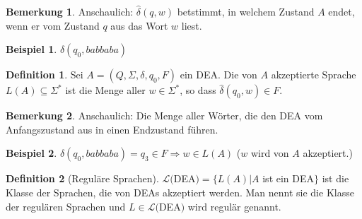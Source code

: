 \documentclass[11pt]{article} %
\theoremstyle{definition}
\newtheorem*{beispiel}{Beispiel}
\newtheorem{definition}{Definition}
\newtheorem*{bemerkung}{Bemerkung}
\begin{document}
\begin{bemerkung}
Anschaulich: $\hat{\delta}(q,w)$ betstimmt, in welchem Zustand $A$ endet, wenn er vom Zustand $q$ aus das Wort $w$ liest.
\end{bemerkung}

\begin{beispiel}
$\hat{\delta}(q_0, babbaba)$
\end{beispiel}

\begin{definition}
Sei $A = (Q, \Sigma, \delta, q_0, F)$ ein DEA. Die von $A$ akzeptierte Sprache $L(A) \subseteq \Sigma^*$ ist die Menge aller $w \in \Sigma^*$, so dass $\hat{\delta}(q_0, w) \in F$.
\end{definition}

\begin{bemerkung}
Anschaulich: Die Menge aller Wörter, die den DEA vom Anfangszustand aus in einen Endzustand führen.
\end{bemerkung}

\begin{beispiel}
$\hat{\delta}(q_0, babbaba) = q_3\in F \Rightarrow w \in L(A)$ ($w$ wird von $A$ akzeptiert.)
\end{beispiel}

\begin{definition}[Reguläre Sprachen]
$\mathcal{L}($DEA$) = \{L(A) | A $ ist ein DEA$ \}$ ist die Klasse der Sprachen, die von DEAs akzeptiert werden. Man nennt sie die Klasse der regulären Sprachen und $L \in \mathcal{L}($DEA$)$ wird regulär genannt.
\end{definition}
\end{document}
